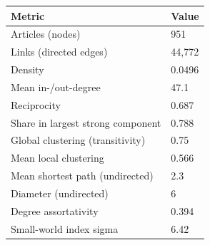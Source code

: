 
\begin{tabular}{ll}
\toprule
Metric & Value\\
\midrule
Articles (nodes) & 951\\
Links (directed edges) & 44,772\\
Density & 0.0496\\
Mean in-/out-degree & 47.1\\
Reciprocity & 0.687\\
Share in largest strong component & 0.788\\
Global clustering (transitivity) & 0.75\\
Mean local clustering & 0.566\\
Mean shortest path (undirected) & 2.3\\
Diameter (undirected) & 6\\
Degree assortativity & 0.394\\
Small-world index sigma & 6.42\\
\bottomrule
\end{tabular}
